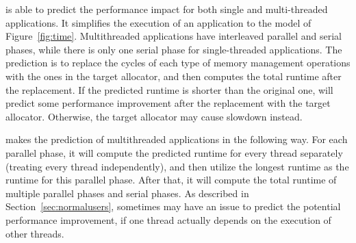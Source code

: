 \MP{} is able to predict the performance impact for both single and multi-threaded applications. It simplifies the execution of an application to the model of Figure~\ref{fig:time}. Multithreaded applications have interleaved parallel and serial phases, while there is only one serial phase for single-threaded applications. The prediction is to replace the cycles of each type of memory management operations with the ones in the target allocator, and then computes the total runtime after the replacement. If the predicted runtime is shorter than the original one, \MP{} will predict some performance improvement after the replacement with the target allocator. Otherwise, the target allocator may cause slowdown instead. 

\MP{} makes the prediction of multithreaded applications in the following way. For each parallel phase, it will compute the predicted runtime for every thread separately (treating every thread independently), and then utilize the longest runtime as the runtime for this parallel phase. 
After that, it will compute the total runtime of multiple parallel phases and serial phases. As described in Section~\ref{sec:normalusers},  sometimes \MP{} may have an issue to predict the potential performance improvement, if one thread actually depends on the execution of other threads. 



 

